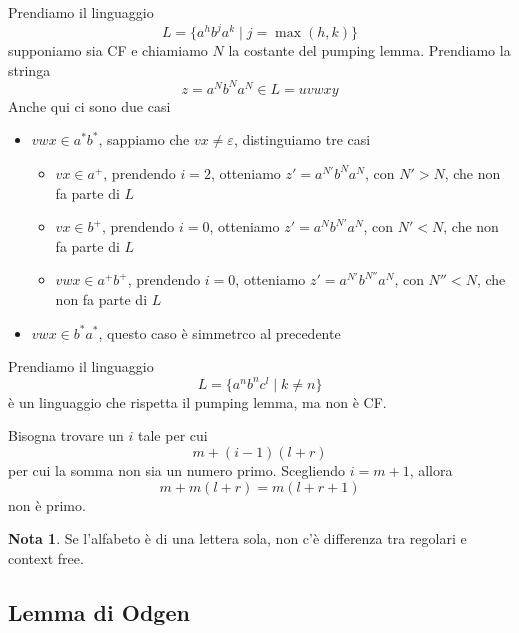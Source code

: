 \documentclass[12pt]{report}
\theoremstyle{definition}
\theoremstyle{regard}
\newtheorem{nota}{Nota}
\begin{document}
\begin{tcolorbox}[breakable]
	Prendiamo il linguaggio
	$$ L = \{ a^h b^j a^k \mid j = \max(h, k) \} $$
	supponiamo sia CF e chiamiamo $N$ la costante del pumping lemma.
	Prendiamo la stringa
	$$ z = a^N b^N a^N  \in L = u v w x y $$
	Anche qui ci sono due casi
	\begin{itemize}
		\item $vwx \in a^* b^*$, sappiamo che $vx \neq \varepsilon$, distinguiamo tre casi
			\begin{itemize}
				\item $vx \in a^+$, prendendo $i = 2$, otteniamo $z' = a^{N'} b^N a^N$, con $N' > N$, che non fa parte di $L$
				\item $vx \in b^+$, prendendo $i = 0$, otteniamo $z' = a^N b^{N'} a^N$, con $N' < N$, che non fa parte di $L$
				\item $vwx \in a^+b^+$, prendendo $i = 0$, otteniamo $z' = a^{N'} b^{N''} a^N$, con $N'' < N$, che non fa parte di $L$
			\end{itemize}
		\item $vwx \in b^* a^*$, questo caso è simmetrco al precedente
	\end{itemize}
\end{tcolorbox}

\begin{tcolorbox}
	Prendiamo il linguaggio
	$$ L = \{ a^n b^n c^l \mid k \neq n \} $$
	è un linguaggio che rispetta il pumping lemma, ma non è CF.
\end{tcolorbox}

Bisogna trovare un $i$ tale per cui 
$$ m + (i - 1)(l + r) $$
per cui la somma non sia un numero primo.
Scegliendo $i = m + 1$, allora 
$$ m + m(l + r) = m(l + r + 1) $$
non è primo.

\begin{nota}
Se l'alfabeto è di una lettera sola, non c'è differenza tra regolari e context free.
\end{nota}

\subsection{Lemma di Odgen}
\end{document}
